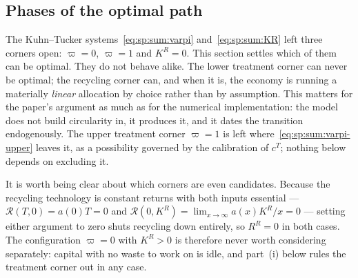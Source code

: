 \subsection{Phases of the optimal path}\label{sec:sp:opt:phases}

The Kuhn--Tucker systems~\eqref{eq:sp:sum:varpi} and~\eqref{eq:sp:sum:KR} left three corners open:
$\varpi=0$, $\varpi=1$ and $K^R=0$. This section settles which of them can be optimal. They do not
behave alike. The lower treatment corner can never be optimal; the recycling corner can, and when it
is, the economy is running a materially \emph{linear} allocation by choice rather than by assumption.
This matters for the paper's argument as much as for the numerical implementation: the model does not
build circularity in, it produces it, and it dates the transition endogenously. The upper treatment
corner $\varpi=1$ is left where~\eqref{eq:sp:sum:varpi-upper} leaves it, as a possibility governed by
the calibration of $c^T$; nothing below depends on excluding it.

It is worth being clear about which corners are even candidates. Because the recycling technology is
constant returns with both inputs essential --- $\mathcal R\left(T,0\right)=a(0)T=0$ and
$\mathcal R\left(0,K^R\right)=\lim_{x\to\infty}a\left(x\right)K^R/x=0$ --- setting either argument to
zero shuts recycling down entirely, so $R^R=0$ in both cases. The configuration $\varpi=0$ with
$K^R>0$ is therefore never worth considering separately: capital with no waste to work on is idle, and
part~(i) below rules the treatment corner out in any case.

